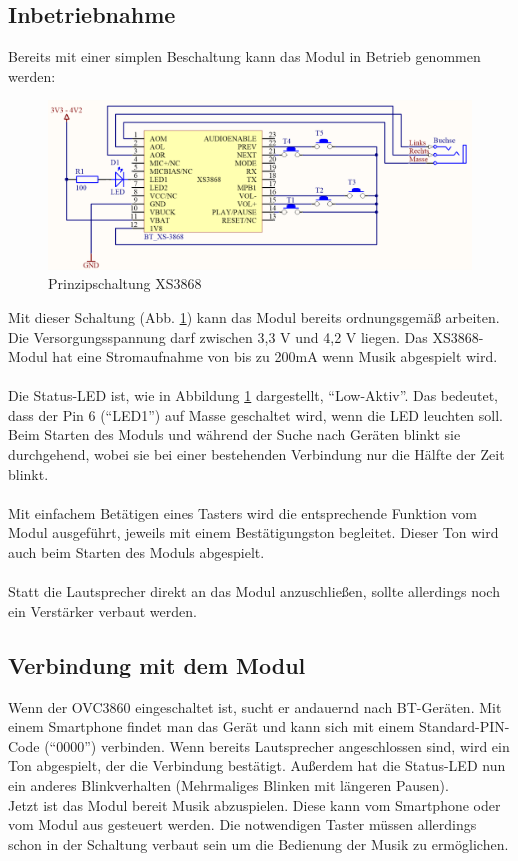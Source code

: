 \subsection*{Inbetriebnahme} \label{subsec:4.1.5}
Bereits mit einer simplen Beschaltung kann das Modul in Betrieb genommen werden:
\begin{figure} [H]
	\centering
	\includegraphics[width=1\textwidth]{img/BTModul/XS3868_Prinzipschaltung.png}
	\caption{Prinzipschaltung XS3868}\label {fig:4.1.5.1}
\end{figure} 
Mit dieser Schaltung (Abb. \ref {fig:4.1.5.1}) kann das Modul bereits ordnungsgemäß arbeiten.
\\
Die Versorgungsspannung darf zwischen 3,3 V und 4,2 V liegen.
Das XS3868-Modul hat eine Stromaufnahme von bis zu 200mA wenn Musik abgespielt wird.
\\ \\
Die Status-LED ist, wie in Abbildung \ref {fig:4.1.5.1} dargestellt, \enquote{Low-Aktiv}.
Das bedeutet, dass der Pin 6 (\enquote{LED1}) auf Masse geschaltet wird, wenn die LED leuchten soll.
Beim Starten des Moduls und während der Suche nach Geräten blinkt sie durchgehend, wobei sie bei einer bestehenden Verbindung nur die Hälfte der Zeit blinkt.
\\ \\
Mit einfachem Betätigen eines Tasters wird die entsprechende Funktion vom Modul ausgeführt, jeweils mit einem Bestätigungston begleitet.
Dieser Ton wird auch beim Starten des Moduls abgespielt.
\\ \\
Statt die Lautsprecher direkt an das Modul anzuschließen, sollte allerdings noch ein Verstärker verbaut werden.
\newpage


\subsection*{Verbindung mit dem Modul} \label{subsec:4.1.6}
Wenn der OVC3860 eingeschaltet ist, sucht er andauernd nach BT-Geräten.
Mit einem Smartphone findet man das Gerät und kann sich mit einem Standard-PIN-Code (\enquote{0000}) verbinden.
Wenn bereits Lautsprecher angeschlossen sind, wird ein Ton abgespielt, der die Verbindung bestätigt.
Außerdem hat die Status-LED nun ein anderes Blinkverhalten (Mehrmaliges Blinken mit längeren Pausen).
\\
Jetzt ist das Modul bereit Musik abzuspielen.
Diese kann vom Smartphone oder vom Modul aus gesteuert werden.
Die notwendigen Taster müssen allerdings schon in der Schaltung verbaut sein um die Bedienung der Musik zu ermöglichen.


